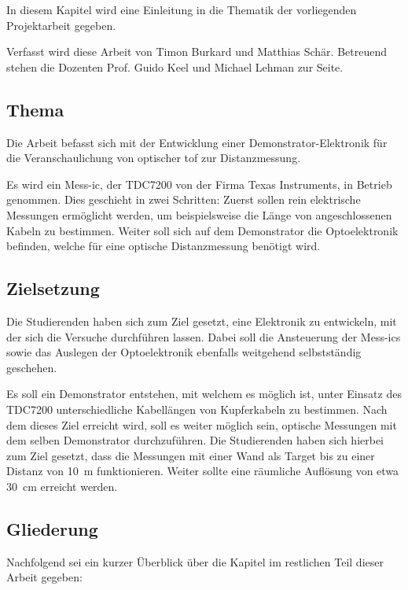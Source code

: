 In diesem Kapitel wird eine Einleitung in die Thematik der vorliegenden Projektarbeit gegeben.

Verfasst wird diese Arbeit von Timon Burkard und Matthias Schär. Betreuend stehen die Dozenten Prof. Guido Keel und
Michael Lehman zur Seite.

\subsection{Thema}

Die Arbeit befasst sich mit der Entwicklung einer Demonstrator-Elektronik für die Veranschaulichung von optischer \acrfull{tof} zur
Distanzmessung.

Es wird ein Mess-\acrshort{ic}, der TDC7200 von der Firma Texas Instruments, in Betrieb genommen. Dies geschieht in zwei
Schritten: Zuerst sollen rein elektrische Messungen ermöglicht werden, um beispielsweise die Länge von angeschlossenen
Kabeln zu bestimmen. Weiter soll sich auf dem Demonstrator die Optoelektronik befinden, welche für eine optische
Distanzmessung benötigt wird.

\subsection{Zielsetzung}

Die Studierenden haben sich zum Ziel gesetzt, eine Elektronik zu entwickeln, mit der sich die Versuche durchführen
lassen. Dabei soll die Ansteuerung der Mess-\acrshort{ic}s sowie das Auslegen der Optoelektronik ebenfalls weitgehend
selbstständig geschehen.

Es soll ein Demonstrator entstehen, mit welchem es möglich ist, unter Einsatz des TDC7200 unterschiedliche Kabellängen von
Kupferkabeln zu bestimmen. Nach dem dieses Ziel erreicht wird, soll es weiter möglich sein, optische Messungen mit dem
selben Demonstrator durchzuführen. Die Studierenden haben sich hierbei zum Ziel gesetzt, dass die Messungen mit einer Wand
als Target bis zu einer Distanz von 10~m funktionieren. Weiter sollte eine räumliche Auflösung von etwa 30~cm erreicht werden.

\subsection{Gliederung}

Nachfolgend sei ein kurzer Überblick über die Kapitel im restlichen Teil dieser Arbeit gegeben:

